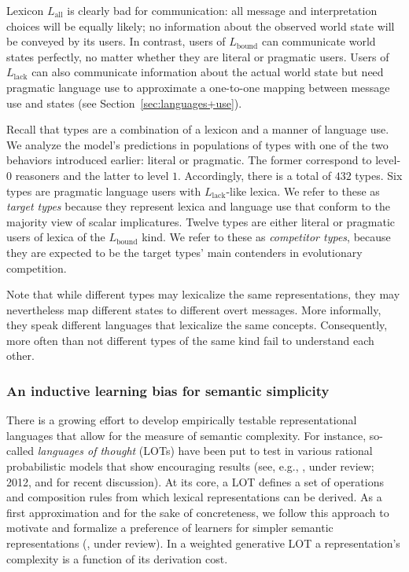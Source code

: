 \documentclass[a4paper, 11pt]{article}
\theoremstyle{Satz}
\newcommand{\mylang}[1]{\ensuremath{L_{\text{#1}}}\xspace} %
\newcommand{\Lall}{\mylang{all}}
\newcommand{\Lbound}{\mylang{bound}}
\newcommand{\Llack}{\mylang{lack}}
\begin{document}
Lexicon $\Lall$ is clearly bad for communication: all message and interpretation choices will
be equally likely; no information about the observed world state will be conveyed
by its users. In contrast, users of $\Lbound$ can communicate world states perfectly, no matter
whether they are literal or pragmatic users. Users of $\Llack$ can also communicate information
about the actual world state but need pragmatic language use to approximate a one-to-one
mapping between message use and states (see Section~\ref{sec:languages+use}).  

Recall that types are a combination of a lexicon and a manner of language use. We analyze the
model's predictions in populations of types with one of the two behaviors introduced earlier:
literal or pragmatic. The former correspond to level-$0$ reasoners and the latter to level $1$. Accordingly, there is a total of $432$ types. Six types are pragmatic language
users with $\Llack$-like lexica. We refer to these as \emph{target types} because they
represent lexica and language use that conform to the majority view of scalar
implicatures. Twelve types are either literal or pragmatic users of lexica of the
$\Lbound$ kind. We refer to these as \emph{competitor types}, because they are expected to be
the target types' main contenders in evolutionary competition. 

Note that while
different types may lexicalize the same representations, they may nevertheless map different
states to different overt messages. More informally, they speak different languages that
lexicalize the same concepts. Consequently, more often than not different types of the same
kind fail to understand each other.




\subsubsection{An inductive learning bias for semantic simplicity}
\label{sec:an-induct-learn}

There is a growing effort to develop empirically testable representational languages that allow
for the measure of semantic complexity. For instance, so-called {\em languages of thought}
(LOTs) have been put to test in various rational probabilistic models that show encouraging
results (see, e.g., \citealt{katz+etal:2008}, \citeauthor{piantadosi+etal:underreview} under review; 2012, and \citealt{piantadosi+jacobs:2016} for recent discussion). At its
core, a LOT defines a set of operations and composition rules from which lexical representations can be
derived. As a first approximation and for the sake of concreteness, we follow this approach to
motivate and formalize a preference of learners for simpler semantic representations
(\citealt{feldman:2000, chater+vitanyi:2003, piantadosi+etal:2012a,kirby+etal:2015}, \citeauthor{piantadosi+etal:underreview} under review). 
In a weighted generative LOT a representation's complexity is a function of its derivation cost.
\end{document}
